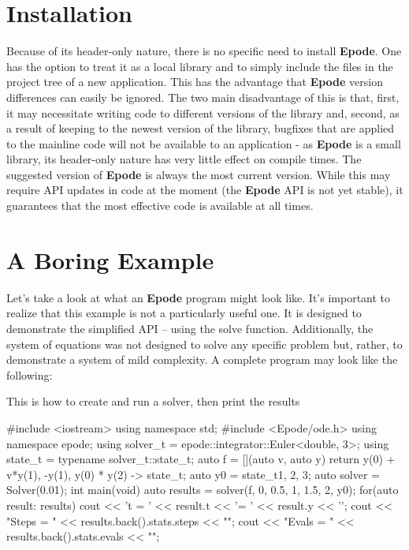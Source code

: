 \documentclass[letterpaper,10pt]{book}
\newcommand{\identifier}[1]{{\color{blue!60}#1}}
\newcommand{\epode}[0]{\textbf{Epode}}
\begin{document}

    \section{Installation}
      Because of its header-only nature, there is no specific need to install \epode{}.  One has the option to treat it as a local library and to simply include the files in the project tree of a new application.  This has the advantage that \epode{} version differences can easily be ignored.  The two main disadvantage of this is that, first, it may necessitate writing code to different versions of the library and, second, as a result of keeping to the newest version of the library, bugfixes that are applied to the mainline code will not be available to an application - as \epode{} is a small library, its header-only nature has very little effect on compile times.  The suggested version of \epode{} is always the most current version.  While this may require API updates in code at the moment (the \epode{} API is not yet stable), it guarantees that the most effective code is available at all times.   

    \section{A Boring Example}
      Let's take a look at what an \epode{} program might look like.  It's important to realize that this example is not a particularly useful one.  It is designed to demonstrate the simplified API -- using the \identifier{solve} function.  Additionally, the system of equations was not designed to solve any specific problem but, rather, to demonstrate a system of mild complexity.  A complete program may look like the following:
  \begin{listing}
    \label{lst:basic}
    \caption{This is how to create and run a solver, then print the results}  
    \begin{epodecode}
      #include <iostream>
      using namespace std;
      #include <Epode/ode.h>
      using namespace epode;
      using solver_t = epode::integrator::Euler<double, 3>;
      using state_t = typename solver_t::state_t;
      auto f = [](auto v, auto y){
	return {
	  y(0) + v*y(1),
	  -y(1),
	  y(0) * y(2)
	}
      } -> state_t;
      auto y0 = state_t{1, 2, 3};
      auto solver = Solver(0.01);
      int main(void) {
	auto results = solver(f, 0, {0.5, 1, 1.5, 2}, y0);    
	for(auto result: results) {
	  cout << 't = ' << result.t << '\ty = ' << result.y << '\n';
	}
	cout << "\tIteration Steps = " << results.back().stats.steps << "\n";
	cout << "\tFunction Evals = " << results.back().stats.evals << "\n";
      }
    \end{epodecode}
  \end{listing}
\end{document}
